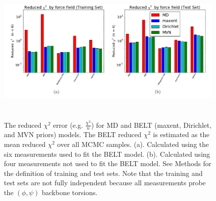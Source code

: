 \documentclass[12pt]{article}
\begin{document}
\begin{figure}

\includegraphics[height=7.25cm]{figure_layouts/figure3.pdf}

\caption{
The reduced $\chi^2$ error (e.g. $\frac{\chi^2}{n}$) for MD and BELT (maxent, Dirichlet, and MVN priors) models.  The BELT reduced $\chi^2$ is estimated as the mean reduced $\chi^2$ over all MCMC samples.  (a).  Calculated using the six measurements used to fit the BELT model.  (b).  Calculated using four measurements not used to fit the BELT model.  See Methods for the definition of training and test sets.  Note that the training and test sets are not fully independent because all measurements probe the $(\phi, \psi)$ backbone torsions.
}
\label{figure:ChiSquared}
\end{figure}
\end{document}
